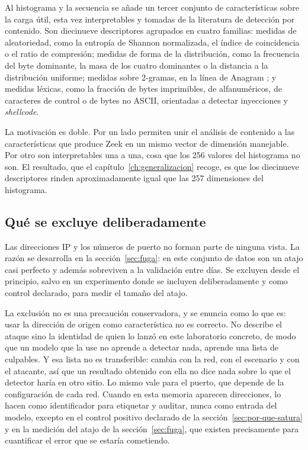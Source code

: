 Al histograma y la secuencia se añade un tercer conjunto de características sobre
la carga útil, esta vez interpretables y tomadas de la literatura de detección
por contenido. Son diecinueve descriptores agrupados en cuatro familias: medidas
de aleatoriedad, como la entropía de Shannon normalizada, el índice de
coincidencia o el ratio de compresión; medidas de forma de la distribución, como
la frecuencia del byte dominante, la masa de los cuatro dominantes o la distancia
a la distribución uniforme; medidas sobre 2-gramas, en la línea de Anagram
\cite{Wang2006}; y medidas léxicas, como la fracción de bytes imprimibles, de
alfanuméricos, de caracteres de control o de bytes no ASCII, orientadas a
detectar inyecciones y \emph{shellcode}.

La motivación es doble. Por un lado permiten unir el análisis de contenido a las
características que produce Zeek en un mismo vector de dimensión manejable. Por
otro son interpretables una a una, cosa que los 256 valores del histograma no
son. El resultado, que el capítulo~\ref{ch:generalizacion} recoge, es que los
diecinueve descriptores rinden aproximadamente igual que las 257 dimensiones del
histograma.

\subsection*{Qué se excluye deliberadamente}

Las direcciones IP y los números de puerto no forman parte de ninguna vista. La
razón se desarrolla en la sección~\ref{sec:fuga}: en este conjunto de datos son
un atajo casi perfecto y además sobreviven a la validación entre días. Se
excluyen desde el principio, salvo en un experimento donde se incluyen
deliberadamente y como control declarado, para medir el tamaño del atajo.

La exclusión no es una precaución conservadora, y se enuncia como lo que
es: usar la dirección de origen como característica no es correcto. No describe
el ataque sino la identidad de quien lo lanzó en este laboratorio concreto, de
modo que un modelo que la use no aprende a detectar nada, aprende una lista de
culpables. Y esa lista no es transferible: cambia con la red, con el escenario y
con el atacante, así que un resultado obtenido con ella no dice nada sobre lo que
el detector haría en otro sitio. Lo mismo vale para el puerto, que depende de la
configuración de cada red. Cuando en esta memoria aparecen direcciones, lo hacen
como identificador para etiquetar y auditar, nunca como entrada del modelo,
excepto en el control positivo declarado de la sección~\ref{sec:por-que-satura} y
en la medición del atajo de la sección~\ref{sec:fuga}, que existen precisamente
para cuantificar el error que se estaría cometiendo.

